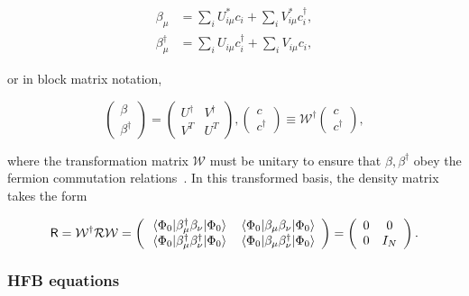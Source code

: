 \begin{align}
\beta_\mu &= \sum_i U^*_{i\mu}c_i + \sum_i V^*_{i\mu}c_i^\dagger, \\
\beta_\mu^\dagger &= \sum_i U_{i\mu}c_i^\dagger + \sum_i V_{i\mu}c_i,
\end{align}

\noindent or in block matrix notation,

\begin{equation}
\left(\begin{array}{c} \beta \\ \beta^\dagger\end{array}\right) = 
\left(\begin{array}{cc} U^\dagger & V^\dagger \\ V^T & U^T \end{array}\right),
\left(\begin{array}{c} c \\ c^\dagger\end{array}\right)
\equiv \mathcal{W}^\dagger \left(\begin{array}{c} c \\ c^\dagger\end{array}\right),
\end{equation}

\noindent where the transformation matrix $\mathcal{W}$ must be unitary to ensure that $\beta, \beta^\dagger$ obey the fermion commutation relations~\cite{Ring1980}. In this transformed basis, the density matrix takes the form 

\begin{equation}
\mathsf{R} = \mathcal{W}^\dagger\mathcal{R}\mathcal{W} = 
\left(\begin{array}{cc}
\expval{\beta_\mu^\dagger \beta_\nu}{\Phi_0} & \expval{\beta_\mu \beta_\nu}{\Phi_0} \\
\expval{\beta_\mu^\dagger \beta_\nu^\dagger}{\Phi_0} & \expval{\beta_\mu \beta_\nu^\dagger}{\Phi_0}
\end{array}\right) = 
\left(\begin{array}{cc}
0 & 0 \\
0 & I_N
\end{array}\right).
\end{equation}


\subsubsection{HFB equations}

